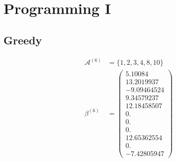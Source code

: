\documentclass[11pt, a4paper, oneside]{memoir}
\begin{document}
\chapter{Programming I}
\section{Greedy}
\begin{align*}
    \mathcal{A}^{(6)} & = \{1, 2, 3, 4, 8, 10\} \\
    \beta^{(6)}       & = \begin{pmatrix}
                              5.10084     \\
                              13.2019937  \\
                              -9.09464524 \\
                              9.34579237  \\
                              12.18458507 \\
                              0.          \\
                              0.          \\
                              0.          \\
                              12.65362554 \\
                              0.          \\
                              -7.42805947
                          \end{pmatrix}
\end{align*}
\end{document}
